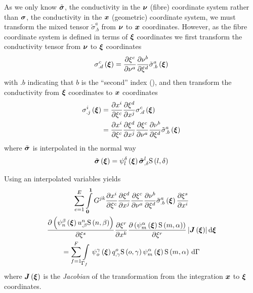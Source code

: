 As we only know $\tilde{\boldsymbol{\mathit{\sigma}}}$, the conductivity in the 
$ \boldsymbol{\nu} $ (fibre) coordinate system rather than $\boldsymbol{\mathit{\sigma}}$, the
conductivity in the $ \boldsymbol{x} $ (geometric) coordinate system, we must transform the mixed
tensor ${\tilde{\sigma}}^{a}_{.b}$ from $ \boldsymbol{\nu} $ to $ \boldsymbol{x} $ coordinates. However, as the
fibre coordinate system is defined in terms of $ \boldsymbol{\xi} $ coordinates we
first transform the conductivity tensor from $ \boldsymbol{\nu} $ to $ \boldsymbol{\xi} $
coordinates \ie
\begin{equation}
   \sigma^{c}_{.d}\left(  \boldsymbol{\xi}  \right) = \dfrac{\partial \xi^{c}}{\partial \nu^{a}}  \dfrac{\partial \nu^{b}}{\partial \xi^{d}} 
   {\tilde{\sigma}}^{a}_{.b}\left(  \boldsymbol{\xi}  \right) 
\end{equation}
with $.b$ indicating that $b$ is the ``second'' index (),
and then transform the conductivity from $ \boldsymbol{\xi} $ coordinates to
$ \boldsymbol{x} $ coordinates \ie
\begin{equation}
  \begin{split}
     \sigma^{i}_{.j}\left(  \boldsymbol{\xi}  \right)  &=
     \dfrac{\partial x^{i}}{\partial \xi^{c}}  \dfrac{\partial \xi^{d}}{\partial x^{j}} 
     {\sigma}^{c}_{.d}\left(  \boldsymbol{\xi}  \right)  \\
    &=  \dfrac{\partial x^{i}}{\partial \xi^{c}}  \dfrac{\partial \xi^{d}}{\partial x^{j}}  \dfrac{\partial \xi^{c}}{\partial \nu^{a}}  \dfrac{\partial \nu^{b}}{\partial \xi^{d}}  {\tilde{\sigma}}^{a}_{.b}\left(  \boldsymbol{\xi}  \right) 
  \end{split}
\end{equation}
where $\tilde{\boldsymbol{\mathit{\sigma}}}$ is interpolated in the normal way \ie
\begin{equation}
   \tilde{\boldsymbol{\mathit{\sigma}}}\left(  \boldsymbol{\xi}  \right) 
  =   \psi_{l}^{\delta} \left(  \boldsymbol{\xi}  \right)    {\tilde{\boldsymbol{\mathit{\sigma}}}}^{l} _{,\delta} 
     \mathrm{S} \left( l,\delta \right)  
\end{equation}

Using an interpolated variables yields
\begin{multline}
  \dsum_{e=1}^{E}\dintl{\vectr{0}}{\vectr{1}}G^{jk}\delby{x^{i}}{\xi^{c}}
    \delby{\xi^{d}}{x^{j}}\delby{\xi^{c}}{\nu^{a}}
    \delby{\nu^{b}}{\xi^{d}}\fnof{{\tilde{\sigma}}^{a}_{.b}}{\vectr{\xi}}\delby{\xi^{s}}{x^{i}} \\
    \delby{\pbrac{\gbfn{n}{\beta}{\vectr{\xi}}\nodedof{u}{n}{\beta}\gsf{n}{\beta}}}{\xi^{s}}
    \delby{\xi^{r}}{x^{k}}\delby{\pbrac{\gbfn{m}{\alpha}{\vectr{\xi}}\gsf{m}{\alpha}}}{\xi^{r}}
    \abs{\fnof{\matr{J}}{\vectr{\xi}}}\exteriorderiv{\vectr{\xi}} \\ 
  = \dsum_{f=1}^{F}\gint{\Gamma_{f}}{}{\gbfn{o}{\gamma}{\vectr{\xi}}\nodedof{q}{o}{\gamma}
    \gsf{o}{\gamma}\gbfn{m}{\alpha}{\vectr{\xi}}\gsf{m}{\alpha}}{\Gamma}
\end{multline}
where $\fnof{\matr{J}}{\vectr{\xi}}$ is the \emph{Jacobian} of the
transformation from the integration $ \boldsymbol{x} $ to $ \boldsymbol{\xi} $ coordinates.


